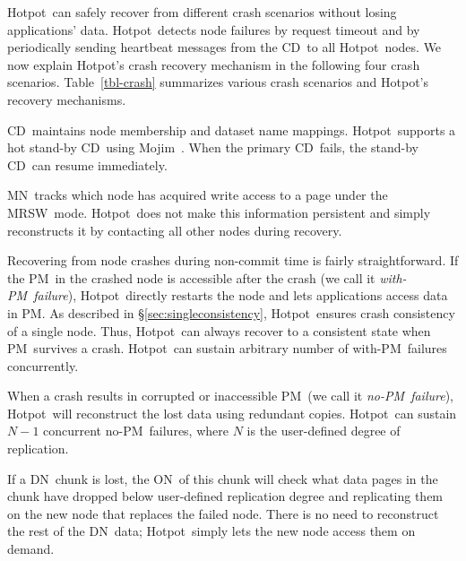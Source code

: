 \documentclass[sigconf]{acmart}
\renewcommand{\em}{\it}
\newcommand{\nvm}{PM}
\newcommand{\hotpot}{Hotpot}
\newcommand{\mrsw}{MRSW}
\newcommand{\cd}{CD}
\newcommand{\on}{ON}
\newcommand{\dn}{DN}
\newcommand{\master}{MN}
\begin{document}
{\hotpot\ can safely recover from different crash scenarios
without losing applications' data.
\hotpot\ detects node failures
by request timeout 
and by periodically sending heartbeat messages from 
the \cd\ to all \hotpot\ nodes.
We now explain \hotpot's crash recovery mechanism
in the following four crash scenarios.
Table~\ref{tbl-crash} summarizes various crash scenarios and \hotpot's recovery mechanisms.


\noindent{\bf Recovering \cd\ and \master.}
\cd\ maintains node membership and dataset name mappings.
\hotpot\ supports a hot stand-by \cd\ using Mojim~\cite{Zhang15-Mojim}.
When the primary \cd\ fails, the stand-by \cd\ can resume immediately.

\master\ tracks which node has acquired write access to a page under the \mrsw\ mode.
\hotpot\ does not make this information persistent
and simply reconstructs it by contacting all other nodes during recovery.

Recovering from node crashes during non-commit time is fairly straightforward.
If the \nvm\ in the crashed node is accessible after the crash (we call it {\em with-\nvm\ failure}),
\hotpot\ directly restarts the node and
lets applications access data in \nvm.
As described in \S\ref{sec:singleconsistency}, \hotpot\ ensures crash consistency of a single node.
Thus, \hotpot\ can always recover to a consistent state 
when \nvm\ survives a crash.
\hotpot\ can sustain arbitrary number of with-\nvm\ failures concurrently. 

When a crash results in corrupted or inaccessible \nvm\ (we call it {\em no-\nvm\ failure}),
\hotpot\ will reconstruct the lost data using redundant copies.
\hotpot\ can sustain $N-1$ concurrent no-\nvm\ failures, where $N$ is the user-defined degree of replication.

If a \dn\ chunk is lost, 
the \on\ of this chunk will check what data pages in the chunk
have dropped below user-defined replication degree
and replicating them on the new node that replaces the failed node. 
There is no need to reconstruct the rest of the \dn\ data;
\hotpot\ simply lets the new node access them on demand.

}
\end{document}
